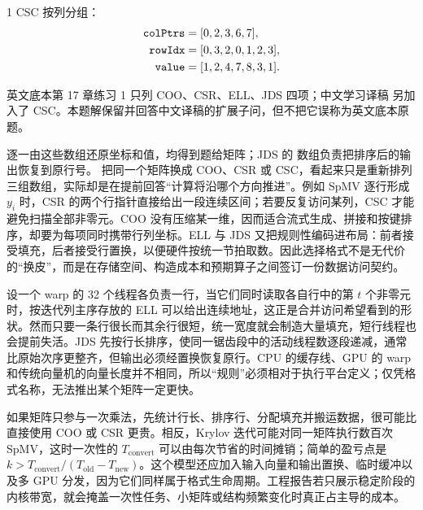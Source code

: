 \begin{solutionexercise}{1}
CSC 按列分组：
\begin{align*}
 \code{colPtrs}&=[0,2,3,6,7],\\
 \code{rowIdx}&=[0,3,2,0,1,2,3],\\
 \code{value}&=[1,2,4,7,8,3,1].
\end{align*}

\editorialnote 英文底本第 17 章练习 1 只列 COO、CSR、ELL、JDS 四项；中文学习译稿
另加入了 CSC。本题解保留并回答中文译稿的扩展子问，但不把它误称为英文底本原题。

\conclusionheading 逐一由这些数组还原坐标和值，均得到题给矩阵；JDS 的 
数组负责把排序后的输出恢复到原行号。
\discussionheading
{}
把同一个矩阵换成 COO、CSR 或 CSC，看起来只是重新排列三组数组，实际却是在提前回答“计算将沿哪个方向推进”。例如 SpMV 逐行形成 $y_i$ 时，CSR 的两个行指针直接给出一段连续区间；若要反复访问某列，CSC 才能避免扫描全部非零元。COO 没有压缩某一维，因而适合流式生成、拼接和按键排序，却要为每项同时携带行列坐标。ELL 与 JDS 又把规则性编码进布局：前者接受填充，后者接受行置换，以便硬件按统一节拍取数。因此选择格式不是无代价的“换皮”，而是在存储空间、构造成本和预期算子之间签订一份数据访问契约。

设一个 warp 的 32 个线程各负责一行，当它们同时读取各自行中的第 $t$ 个非零元时，按迭代列主序存放的 ELL 可以给出连续地址，这正是合并访问希望看到的形状。然而只要一条行很长而其余行很短，统一宽度就会制造大量填充，短行线程也会提前失活。JDS 先按行长排序，使同一锯齿段中的活动线程数逐段递减，通常比原始次序更整齐，但输出必须经置换恢复原行。CPU 的缓存线、GPU 的 warp 和传统向量机的向量长度并不相同，所以“规则”必须相对于执行平台定义；仅凭格式名称，无法推出某个矩阵一定更快。

如果矩阵只参与一次乘法，先统计行长、排序行、分配填充并搬运数据，很可能比直接使用 COO 或 CSR 更贵。相反，Krylov 迭代可能对同一矩阵执行数百次 SpMV，这时一次性的 $T_{\mathrm{convert}}$ 可以由每次节省的时间摊销；简单的盈亏点是 $k>T_{\mathrm{convert}}/(T_{\mathrm{old}}-T_{\mathrm{new}})$。这个模型还应加入输入向量和输出置换、临时缓冲以及多 GPU 分发，因为它们同样属于格式生命周期。工程报告若只展示稳定阶段的内核带宽，就会掩盖一次性任务、小矩阵或结构频繁变化时真正占主导的成本。


\end{solutionexercise}
